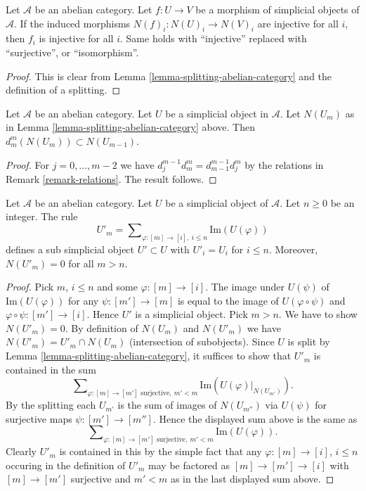 \begin{lemma}
\label{lemma-injective-map-simplicial-abelian}
Let $\mathcal{A}$ be an abelian category.
Let $f : U \to V$ be a morphism of
simplicial objects of $\mathcal{A}$.
If the induced morphisms $N(f)_i : N(U)_i \to N(V)_i$
are injective for all $i$, then $f_i$ is
injective for all $i$. Same holds with ``injective'' replaced
with ``surjective'', or ``isomorphism''.
\end{lemma}

\begin{proof}
This is clear from Lemma \ref{lemma-splitting-abelian-category}
and the definition of a splitting.
\end{proof}


\begin{lemma}
\label{lemma-N-d-in-N}
Let $\mathcal{A}$ be an abelian category.
Let $U$ be a simplicial object in $\mathcal{A}$.
Let $N(U_m)$ as in Lemma \ref{lemma-splitting-abelian-category} above.
Then $d^m_m(N(U_m)) \subset N(U_{m - 1})$.
\end{lemma}

\begin{proof}
For $j = 0, \ldots, m - 2$ we have
$d^{m - 1}_j d^m_m = d^{m - 1}_{m - 1} d^m_j$
by the relations in Remark \ref{remark-relations}.
The result follows.
\end{proof}

\begin{lemma}
\label{lemma-simplicial-abelian-n-skel-sub}
Let $\mathcal{A}$ be an abelian category.
Let $U$ be a simplicial object of $\mathcal{A}$.
Let $n \geq 0$ be an integer.
The rule
$$
U'_m = \sum\nolimits_{\varphi : [m] \to [i], \ i\leq n} \text{Im}(U(\varphi))
$$
defines a sub simplicial object $U' \subset U$ with $U'_i = U_i$
for $i \leq n$.
Moreover, $N(U'_m) = 0$ for all $m > n$.
\end{lemma}

\begin{proof}
Pick $m$, $i \leq n$ and some $\varphi : [m] \to [i]$.
The image under $U(\psi)$ of $\text{Im}(U(\varphi))$
for any $\psi : [m'] \to [m]$ is
equal to the image of $U(\varphi \circ \psi)$ and
$\varphi \circ \psi : [m'] \to [i]$.
Hence $U'$ is a simplicial object.
Pick $m > n$. We have to show $N(U'_m) = 0$.
By definition of $N(U_m)$ and $N(U'_m)$ we have
$N(U'_m) = U'_m \cap N(U_m)$ (intersection of subobjects).
Since $U$ is split by Lemma \ref{lemma-splitting-abelian-category},
it suffices to show that $U'_m$ is contained in the sum
$$
\sum\nolimits_{\varphi : [m] \to [m']\text{ surjective}, \ m' < m}
\text{Im}(U(\varphi)|_{N(U_{m'})}).
$$
By the splitting each $U_{m'}$ is the sum of images of
$N(U_{m''})$ via $U(\psi)$ for surjective maps
$\psi : [m'] \to [m'']$. Hence the displayed sum above
is the same as
$$
\sum\nolimits_{\varphi : [m] \to [m']\text{ surjective}, \ m' < m}
\text{Im}(U(\varphi)).
$$
Clearly $U'_m$ is contained in this by the simple fact that
any $\varphi : [m] \to [i]$, $i \leq n$ occuring in the definition
of $U'_m$ may be factored as
$[m] \to [m'] \to [i]$ with $[m] \to [m']$ surjective
and $m' < m$ as in the last displayed sum above.
\end{proof}


